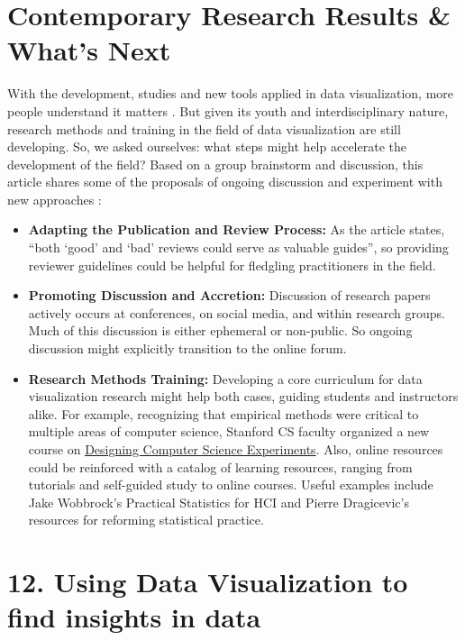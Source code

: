 \documentclass[]{book}
\providecommand{\tightlist}{%
  \setlength{\itemsep}{0pt}\setlength{\parskip}{0pt}}
\theoremstyle{definition}
\theoremstyle{definition}
\theoremstyle{definition}
\theoremstyle{remark}
\begin{document}
\section{Contemporary Research Results \& What's
Next}\label{contemporary-research-results-whats-next}

With the development, studies and new tools applied in data
visualization, more people understand it matters \citep{next_steps} .
But given its youth and interdisciplinary nature, research methods and
training in the field of data visualization are still developing. So, we
asked ourselves: what steps might help accelerate the development of the
field? Based on a group brainstorm and discussion, this article shares
some of the proposals of ongoing discussion and experiment with new
approaches \citep{next_steps}:

\begin{itemize}
\tightlist
\item
  \textbf{Adapting the Publication and Review Process:} As the article
  states, ``both `good' and `bad' reviews could serve as valuable
  guides'', so providing reviewer guidelines could be helpful for
  fledgling practitioners in the field.
\item
  \textbf{Promoting Discussion and Accretion:} Discussion of research
  papers actively occurs at conferences, on social media, and within
  research groups. Much of this discussion is either ephemeral or
  non-public. So ongoing discussion might explicitly transition to the
  online forum.
\item
  \textbf{Research Methods Training:} Developing a core curriculum for
  data visualization research might help both cases, guiding students
  and instructors alike. For example, recognizing that empirical methods
  were critical to multiple areas of computer science, Stanford CS
  faculty organized a new course on
  \href{http://sing.stanford.edu/cs303-sp11/}{Designing Computer Science
  Experiments}. Also, online resources could be reinforced with a
  catalog of learning resources, ranging from tutorials and self-guided
  study to online courses. Useful examples include Jake Wobbrock's
  Practical Statistics for HCI and Pierre Dragicevic's resources for
  reforming statistical practice.
\end{itemize}

\section{12. Using Data Visualization to find insights in
data}\label{using-data-visualization-to-find-insights-in-data}
\end{document}
